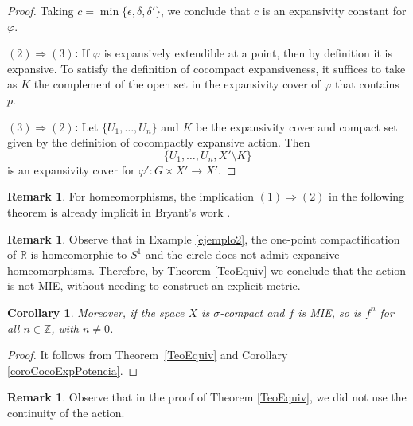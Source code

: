 \documentclass[12pt]{amsart}
\newcommand{\R}{\mathbb R}
\theoremstyle{plain}
\newtheorem{corollary}[theorem]{Corollary}
\theoremstyle{definition}
\newtheorem{remark}[theorem]{Remark}
\theoremstyle{remark}
\begin{document}
\begin{proof}
Taking \( c = \min \{ \epsilon, \delta, \delta' \} \), we conclude that \( c \) is an expansivity constant for \( \varphi \).

\vspace{0.5em}
\textbf{\( (2) \Rightarrow (3) \):}  
If \( \varphi \) is expansively extendible at a point, then by definition it is expansive. To satisfy the definition of cocompact expansiveness, it suffices to take as \( K \) the complement of the open set in the expansivity cover of \( \varphi \) that contains \( p \).


\vspace{0.5em}
\textbf{\( (3) \Rightarrow (2) \):}  
Let \( \{ U_1, \ldots, U_n \} \) and \( K \) be the expansivity cover and compact set given by the definition of cocompactly expansive action. Then
\[
\{ U_1, \ldots, U_n, X' \setminus K \}
\]
is an expansivity cover for \( \varphi' : G \times X' \to X' \).
\end{proof}



\begin{remark}
For homeomorphisms, the implication $(1)\Rightarrow(2)$ in the following theorem is already implicit in Bryant's work \cite{Bryant}.
\end{remark}

\begin{remark}
Observe that in Example \ref{ejemplo2}, the one-point compactification of \(\R\) is homeomorphic to \(S^1\)
and the circle does not admit expansive homeomorphisms. Therefore, by Theorem \ref{TeoEquiv} we conclude that the action is not MIE, without needing to construct an explicit metric.
\end{remark}

\begin{corollary}
 Moreover, if the space \( X \) is $\sigma$-compact
 and \( f \) is MIE, so is \( f^n \) for all \( n \in \mathbb{Z} \), with $n \neq 0$.
\end{corollary}

\begin{proof}
It follows from Theorem~\ref{TeoEquiv} and Corollary \ref{coroCocoExpPotencia}.
\end{proof}

\begin{remark}
Observe that in the proof of Theorem \ref{TeoEquiv}, we did not use the continuity of the action.
\end{remark}
\end{document}
